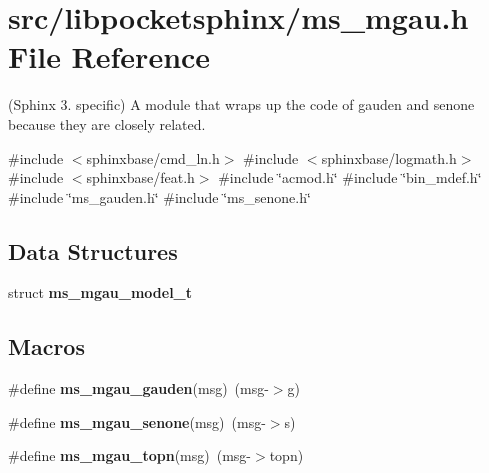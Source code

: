 \section{src/libpocketsphinx/ms\+\_\+mgau.h File Reference}
\label{ms__mgau_8h}


(Sphinx 3. specific) A module that wraps up the code of gauden and senone because they are closely related.  


{\ttfamily \#include $<$sphinxbase/cmd\+\_\+ln.\+h$>$}\newline
{\ttfamily \#include $<$sphinxbase/logmath.\+h$>$}\newline
{\ttfamily \#include $<$sphinxbase/feat.\+h$>$}\newline
{\ttfamily \#include \char`\"{}acmod.\+h\char`\"{}}\newline
{\ttfamily \#include \char`\"{}bin\+\_\+mdef.\+h\char`\"{}}\newline
{\ttfamily \#include \char`\"{}ms\+\_\+gauden.\+h\char`\"{}}\newline
{\ttfamily \#include \char`\"{}ms\+\_\+senone.\+h\char`\"{}}\newline
\subsection*{Data Structures}
\begin{DoxyCompactItemize}
\item 
struct \textbf{ ms\+\_\+mgau\+\_\+model\+\_\+t}
\end{DoxyCompactItemize}
\subsection*{Macros}
\begin{DoxyCompactItemize}
\item 
\mbox{\label{ms__mgau_8h_a95f75d32387d89eb6fa2bc65e032d34c}} 
\#define {\bfseries ms\+\_\+mgau\+\_\+gauden}(msg)~(msg-\/$>$g)
\item 
\mbox{\label{ms__mgau_8h_a182da1c0e7872e853566f7728001d00c}} 
\#define {\bfseries ms\+\_\+mgau\+\_\+senone}(msg)~(msg-\/$>$s)
\item 
\mbox{\label{ms__mgau_8h_acad38d81d6485f2aad5176f8f4283579}} 
\#define {\bfseries ms\+\_\+mgau\+\_\+topn}(msg)~(msg-\/$>$topn)
\end{DoxyCompactItemize}
